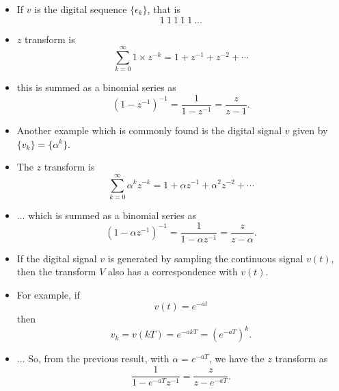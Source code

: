 \begin{slide}\label{slide:l8s1a1}

\begin{itemize}

\item If $v$ is the digital sequence $\{\epsilon_k\}$, that is
\[1\ 1\ 1\ 1\ 1\ \ldots\]

\item $z$ transform is
\[\sum_{k=0}^{\infty} 1\times z^{-k} = 1 + z^{-1} + z^{-2}+\cdots\] 

\item this is summed
as a binomial series as \[(1-z^{-1})^{-1} = \frac{1}{1-z^{-1}} =
\frac{z}{z-1}.\] 

\end{itemize}
\end{slide}

\begin{slide}\label{slide:l8s1b}

\begin{itemize}

\item Another example which is commonly found is the digital signal $v$
given by $\{v_k\} = \{\alpha^k\}$. 

\item The $z$ transform is
\[\sum_{k=0}^{\infty} \alpha^{k} z^{-k} = 1 + \alpha z^{-1} + \alpha^2
z^{-2}+\cdots\] 

\item $\ldots$ which is summed as a binomial series as
\[(1-\alpha z^{-1})^{-1} = \frac{1}{1-\alpha
  z^{-1}} = \frac{z}{z-\alpha}.\]

\end{itemize}

\end{slide}

\begin{slide}\label{slide:l8s1c}

\begin{itemize}

\item If the digital signal $v$ is generated by sampling the continuous
signal $v(t)$, then the transform $V$ also has a correspondence
with $v(t)$. 

\item For example, if \[v(t) = e^{-at}\] then \[v_k = v(kT)
= e^{-akT} = (e^{-aT})^k.\] 

\item $\ldots$ So, from the previous result, with
$\alpha=e^{-aT}$, we have the $z$ transform as
\[\frac{1}{1-e^{-aT}z^{-1}}=\frac{z}{z-e^{-aT}}.\]

\end{itemize}

\end{slide}

